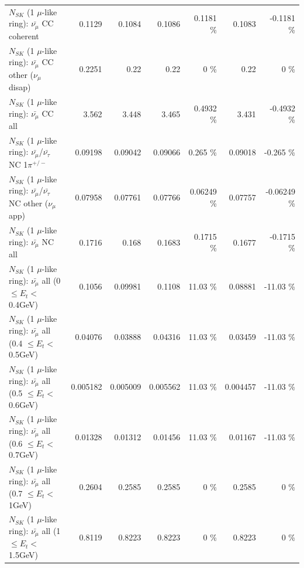 \begin{table}
\begin{tabular}{| l | r | r | r  r | r  r |}
                       $N_{SK}$ (1 $\mu$-like ring): $\bar{\nu_\mu}$ CC coherent &          0.1129 &          0.1084 &          0.1086 &   0.1181 \%  &          0.1083 &  -0.1181 \%  \\ 
        $N_{SK}$ (1 $\mu$-like ring): $\bar{\nu_\mu}$ CC other ($\nu_\mu$ disap) &          0.2251 &            0.22 &            0.22 &        0 \%  &            0.22 &        0 \%  \\ 
                          $N_{SK}$ (1 $\mu$-like ring): $\bar{\nu_{\mu}}$ CC all &           3.562 &           3.448 &           3.465 &   0.4932 \%  &           3.431 &  -0.4932 \%  \\ 
\hline
  $N_{SK}$ (1 $\mu$-like ring): $\bar{\nu_\mu}$/$\bar{\nu_\tau}$ NC 1$\pi^{+/-}$ &         0.09198 &         0.09042 &         0.09066 &    0.265 \%  &         0.09018 &   -0.265 \%  \\ 
$N_{SK}$ (1 $\mu$-like ring): $\bar{\nu_\mu}$/$\bar{\nu_\tau}$ NC other ($\nu_\mu$ app) &         0.07958 &         0.07761 &         0.07766 &  0.06249 \%  &         0.07757 & -0.06249 \%  \\ 
                          $N_{SK}$ (1 $\mu$-like ring): $\bar{\nu_{\mu}}$ NC all &          0.1716 &           0.168 &          0.1683 &   0.1715 \%  &          0.1677 &  -0.1715 \%  \\ 
\hline
   $N_{SK}$ (1 $\mu$-like ring): $\bar{\nu_{\mu}}$ all (0 $\leq E_{t} <$ 0.4GeV) &          0.1056 &         0.09981 &          0.1108 &    11.03 \%  &         0.08881 &   -11.03 \%  \\ 
 $N_{SK}$ (1 $\mu$-like ring): $\bar{\nu_{\mu}}$ all (0.4 $\leq E_{t} <$ 0.5GeV) &         0.04076 &         0.03888 &         0.04316 &    11.03 \%  &         0.03459 &   -11.03 \%  \\ 
 $N_{SK}$ (1 $\mu$-like ring): $\bar{\nu_{\mu}}$ all (0.5 $\leq E_{t} <$ 0.6GeV) &        0.005182 &        0.005009 &        0.005562 &    11.03 \%  &        0.004457 &   -11.03 \%  \\ 
 $N_{SK}$ (1 $\mu$-like ring): $\bar{\nu_{\mu}}$ all (0.6 $\leq E_{t} <$ 0.7GeV) &         0.01328 &         0.01312 &         0.01456 &    11.03 \%  &         0.01167 &   -11.03 \%  \\ 
   $N_{SK}$ (1 $\mu$-like ring): $\bar{\nu_{\mu}}$ all (0.7 $\leq E_{t} <$ 1GeV) &          0.2604 &          0.2585 &          0.2585 &        0 \%  &          0.2585 &        0 \%  \\ 
   $N_{SK}$ (1 $\mu$-like ring): $\bar{\nu_{\mu}}$ all (1 $\leq E_{t} <$ 1.5GeV) &          0.8119 &          0.8223 &          0.8223 &        0 \%  &          0.8223 &        0 \%  \\ 

\end{tabular}
\end{table}
